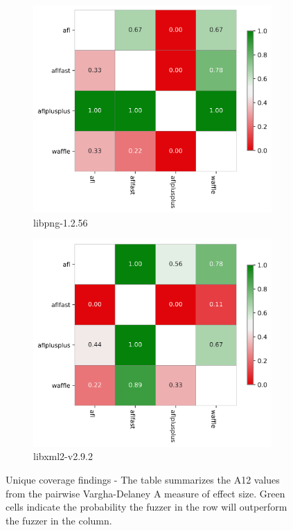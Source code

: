 \begin{figure}
    \begin{subfigure}[b]{0.475\linewidth}
        \centering
        \includegraphics[width=0.95\linewidth]{Experiments/libpng-1.2.56_varga_delaney_a12_plot.png}
        \caption{libpng-1.2.56}
        \label{fig:sub:libpng-vda12}
    \end{subfigure}
    \begin{subfigure}[b]{0.475\linewidth}
        \centering
        \includegraphics[width=0.95\linewidth]{Experiments/libxml2-v2.9.2_varga_delaney_a12_plot.png}
        \caption{libxml2-v2.9.2}
        \label{fig:sub:libxml-vda12}
    \end{subfigure}

    \caption{Unique coverage findings - The table summarizes the A12 values from the pairwise Vargha-Delaney A measure of effect size. Green cells indicate the probability the fuzzer in the row will outperform the fuzzer in the column.}
    \label{fig:vda12}
\end{figure}



